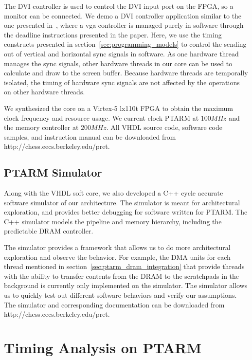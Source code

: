 The DVI controller is used to control the DVI input port on the FPGA, so a monitor can be connected.
We demo a DVI controller application similar to the one presented in~\cite{ip2006processor}, where a vga controller is managed purely in software through the deadline instructions presented in the paper.
Here, we use the timing constructs presented in section~\ref{sec:programming_models} to control the sending out of vertical and horizontal sync signals in software.
As one hardware thread manages the sync signals, other hardware threads in our core can be used to calculate and draw to the screen buffer.  
Because hardware threads are temporally isolated, the timing of hardware sync signals are not affected by the operations on other hardware threads.  

We synthesized the core on a Virtex-5 lx110t FPGA to obtain the maximum clock frequency and resource usage. 
We current clock PTARM at $100MHz$ and the memory controller at $200MHz$. 
All VHDL source code, software code samples, and instruction manual can be downloaded from http://chess.eecs.berkeley.edu/pret.   

\subsection{PTARM Simulator}
\label{sec:ptarm_sim}
Along with the VHDL soft core, we also developed a C++ cycle accurate software simulator of our architecture.
The simulator is meant for architectural exploration, and provides better debugging for software written for PTARM.  
The C++ simulator models the pipeline and memory hierarchy, including the predictable DRAM controller.  

The simulator provides a framework that allows us to do more architectural exploration and observe the behavior.
For example, the DMA units for each thread mentioned in section~\ref{sec:ptarm_dram_integration} that 
provide threads with the ability to transfer contents from the DRAM to the scratchpads in the background is currently only implemented on the simulator. 
The simulator allows us to quickly test out different software behaviors and verify our assumptions. 
The simulator and corresponding documentation can be downloaded from http://chess.eecs.berkeley.edu/pret. 


\section{Timing Analysis on PTARM}
\label{sec:wcet}

